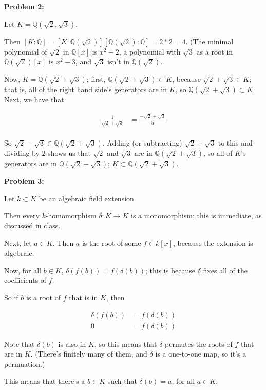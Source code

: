 \documentclass[a4paper,12pt]{article}
\newcommand{\shunt}{\vspace{20mm}}
\newcommand{\de}{\delta}
\newcommand{\Q}{\mathbb{Q}}
\begin{document}
\shunt

{\bf Problem 2:} 

Let $K = \Q(\sqrt{2},\sqrt{3})$.

Then $[K:\Q] = [K:\Q(\sqrt{2})][\Q(\sqrt{2}):\Q] = 2*2=4$. (The minimal polynomial of $\sqrt{2}$ in $\Q[x]$ is $x^2-2$, a polynomial with $\sqrt{3}$ as a root in $\Q(\sqrt{2})[x]$ is $x^2-3$, and $\sqrt{3}$ isn't in $\Q(\sqrt{2})$.

Now, $K = \Q(\sqrt{2}+\sqrt{3})$;  first, $\Q(\sqrt{2}+\sqrt{3}) \subset K$, because $\sqrt{2}+\sqrt{3} \in K$; that is, all of the right hand side's generators are in $K$, so $\Q(\sqrt{2}+\sqrt{3}) \subset K$. Next, we have that

\begin{align*}
\frac{1}{\sqrt{2}+\sqrt{3}} &= \frac{-\sqrt{2}+\sqrt{3}}{5}\\
\end{align*}

So $\sqrt{2}-\sqrt{3} \in \Q(\sqrt{2}+\sqrt{3})$. Adding (or subtracting) $\sqrt{2}+\sqrt{3}$ to this and dividing by $2$ shows us that $\sqrt{2}$ and $\sqrt{3}$ are in $\Q(\sqrt{2}+\sqrt{3})$, so all of $K$'s generators are in $\Q(\sqrt{2}+\sqrt{3})$; $K \subset \Q(\sqrt{2}+\sqrt{3})$.

\shunt

{\bf Problem 3:} 

Let $k \subset K$ be an algebraic field extension.

Then every $k$-homomorphism $\de: K \to K$ is a monomorphism; this is immediate, as discussed in class.

Next, let $a \in K$. Then $a$ is the root of some $f \in k[x]$, because the extension is algebraic.

Now, for all $b \in K$, $\de(f(b)) = f(\de(b))$; this is because $\de$ fixes all of the coefficients of $f$.

So if $b$ is a root of $f$ that is in $K$, then 

\begin{align*}
\de(f(b)) &= f(\de(b)) \\
0 &= f(\de(b))
\end{align*}

Note that $\de(b)$ is also in $K$, so this means that $\de$ permutes the roots of $f$ that are in $K$. (There's finitely many of them, and $\de$ is a one-to-one map, so it's a permuation.)

This means that there's a $b \in K$ such that $\de(b) = a$, for all $a \in K$.
\end{document}
